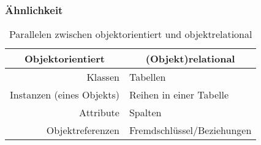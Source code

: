 \begin{frame}
    \frametitle{Ähnlichkeit}

    \begin{table}
        \begin{small}
            \label{tab:OODBvsORDB}
            \begin{center}
                \begin{tabular}[c]{|r|l|}
                    \hline
                    \multicolumn{1}{|c|}{\textbf{Objektorientiert}} &
                    \multicolumn{1}{c|}{\textbf{(Objekt)relational}} \\
                    \hline
                    Klassen                   & Tabellen \\
                    Instanzen (eines Objekts) & Reihen in einer Tabelle \\
                    Attribute                 & Spalten \\
                    Objektreferenzen          & Fremdschlüssel/Beziehungen \\
                    \hline
                \end{tabular}
            \end{center}
            \caption{Parallelen zwischen objektorientiert und objektrelational}
        \end{small}
    \end{table}

\end{frame}

